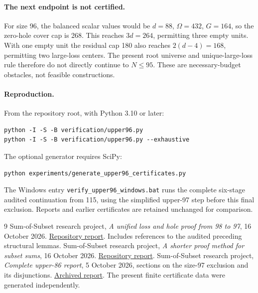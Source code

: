 \documentclass[11pt,a4paper]{article}
\begin{document}
\paragraph{The next endpoint is not certified.}
For size 96, the balanced scalar values would be
$d=88$, $\Omega=432$, $G=164$, so the zero-hole cover cap is 268.
This reaches $3d=264$, permitting three empty units. With one empty
unit the residual cap 180 also reaches $2(d-4)=168$, permitting two
large-loss centers. The present root universe and unique-large-loss
rule therefore do not directly continue to $N\le95$.
These are necessary-budget obstacles, not feasible constructions.

\paragraph{Reproduction.}
From the repository root, with Python 3.10 or later:
\begin{verbatim}
python -I -S -B verification/upper96.py
python -I -S -B verification/upper96.py --exhaustive
\end{verbatim}
The optional generator requires SciPy:
\begin{verbatim}
python experiments/generate_upper96_certificates.py
\end{verbatim}
The Windows entry \texttt{verify\_upper96\_windows.bat} runs the complete
six-stage audited continuation from 115, using the simplified upper-97
step before this final exclusion. Reports and earlier certificates are
retained unchanged for comparison.

\begin{thebibliography}{9}
 Sum-of-Subset research project,
\emph{A unified loss and hole proof from 98 to 97}, 16 October 2026.
\href{https://github.com/iH-3/Sum-of-Subset/blob/main/reports/upper97_from98_20261016.pdf}{Repository report}.
Includes references to the audited preceding structural lemmas.
 Sum-of-Subset research project,
\emph{A shorter proof method for subset sums}, 16 October 2026.
\href{https://github.com/iH-3/Sum-of-Subset/blob/main/reports/proof_method_20261016.pdf}{Repository report}.
 Sum-of-Subset research project,
\emph{Complete upper-86 report}, 5 October 2026, sections on the size-97
exclusion and its disjunctions.
\href{https://github.com/iH-3/Sum-of-Subset/blob/main/reports/upper86_complete_20261005.pdf}{Archived report}.
The present finite certificate data were generated independently.
\end{thebibliography}
\end{document}
